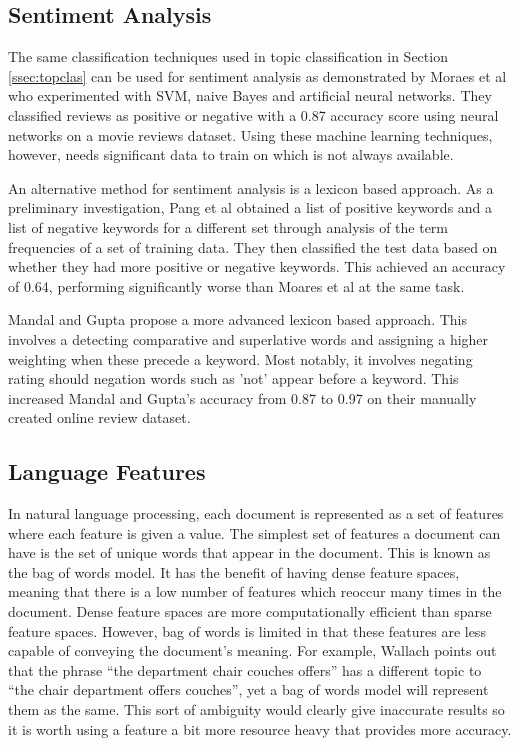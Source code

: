 		\subsection{Sentiment Analysis}
			The same classification techniques used in topic classification in Section \ref{ssec:topclas} can be used for sentiment analysis as demonstrated by Moraes et al who experimented with SVM, naive Bayes and artificial neural networks. They classified reviews as positive or negative with a 0.87 accuracy score using neural networks on a movie reviews dataset\cite{sentiment_ann_moares}. Using these machine learning techniques, however, needs significant data to train on which is not always available. 
			
			An alternative method for sentiment analysis is a lexicon based approach. As a preliminary investigation, Pang et al obtained a list of positive keywords and a list of negative keywords for a different set through analysis of the term frequencies of a set of training data\cite{sentiment_ml_pang}. They then classified the test data based on whether they had more positive or negative keywords. This achieved an accuracy of 0.64, performing significantly worse than Moares et al at the same task.
			
			Mandal and Gupta propose a more advanced lexicon based approach\cite{lexicon_sentiments_mandal}. This involves a detecting comparative and superlative words and assigning a higher weighting when these precede a keyword. Most notably, it involves negating rating should negation words such as 'not' appear before a keyword. This increased Mandal and Gupta's accuracy from 0.87 to 0.97 on their manually created online review dataset.			
		\subsection{Language Features}\label{litrev-langfet}
			In natural language processing, each document is represented as a set of features where each feature is given a value. The simplest set of features a document can have is the set of unique words that appear in the document. This is known as the bag of words model. It has the benefit of having dense feature spaces, meaning that there is a low number of features which reoccur many times in the document. Dense feature spaces are more computationally efficient than sparse feature spaces. However, bag of words is limited in that these features are less capable of conveying the document's meaning. For example, Wallach points out that the phrase “the department chair couches oﬀers” has a diﬀerent topic to “the chair department oﬀers couches”, yet a bag of words model will represent them as the same\cite{beyond_bag_wallach}. This sort of ambiguity would clearly give inaccurate results so it is worth using a feature a bit more resource heavy that provides more accuracy.  

